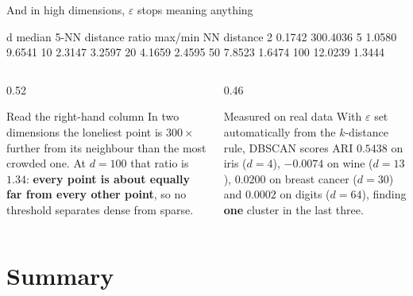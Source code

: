 \documentclass[aspectratio=169]{beamer}
\begin{document}
\begin{frame}[fragile,shrink=8]{And in high dimensions, $\varepsilon$ stops meaning anything}
\begin{outblk}
  d      median 5-NN distance   ratio max/min NN distance
    2            0.1742              300.4036
    5            1.0580                9.6541
   10            2.3147                3.2597
   20            4.1659                2.4595
   50            7.8523                1.6474
  100           12.0239                1.3444
\end{outblk}
  \vspace{0.2em}
  \begin{columns}[T]
    \begin{column}{0.52\textwidth}
      \begin{block}{Read the right-hand column}
        \small In two dimensions the loneliest point is $300\times$ further
        from its neighbour than the most crowded one. At $d = 100$ that ratio
        is $1.34$: \textbf{every point is about equally far from every other
        point}, so no threshold separates dense from sparse.
      \end{block}
    \end{column}
    \begin{column}{0.46\textwidth}
      \begin{alertblock}{Measured on real data}
        \small With $\varepsilon$ set automatically from the $k$-distance
        rule, DBSCAN scores ARI $0.5438$ on iris ($d=4$), $-0.0074$ on wine
        ($d=13$), $0.0200$ on breast cancer ($d=30$) and $0.0002$ on digits
        ($d=64$), finding \textbf{one} cluster in the last three.
      \end{alertblock}
    \end{column}
  \end{columns}
\end{frame}

\section{Summary}
\label{sec:summary}
\end{document}
